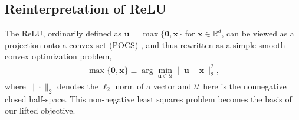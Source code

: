 \documentclass{article}
\begin{document}
	
	\subsection{Reinterpretation of ReLU}
	
	The ReLU, ordinarily defined as $\mathbf{u}=\max\{\mathbf{0}, \mathbf{x}\}$ for  $\mathbf{x}\in\mathbb{R}^d$, can be viewed as a projection onto a convex set (POCS) \citet{bauschke1996projection}, and thus rewritten as a simple smooth convex optimization problem,
	\begin{align}\label{eqn:relu}
	\max\{\mathbf{0}, \mathbf{x}\} \equiv \arg\min_{\mathbf{u}\in\mathcal{U}}\|\mathbf{u}-\mathbf{x}\|_2^2,
	\end{align}
	where $\|\cdot\|_2$ denotes the $\ell_2$ norm of a vector and $\mathcal{U}$ here is the nonnegative closed half-space. This non-negative least squares problem becomes the basis of our lifted objective.
		
\end{document}
